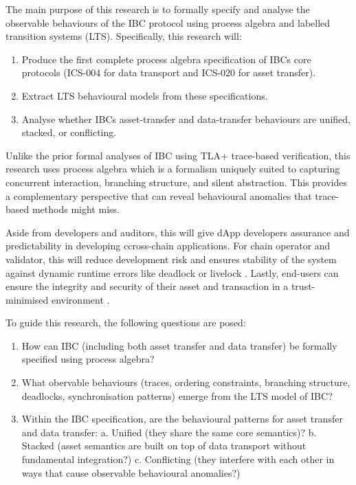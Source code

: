 The main purpose of this research is to formally specify and analyse the
observable behaviours of the IBC protocol using process algebra and
labelled transition systems (LTS). Specifically, this research will:

\begin{enumerate}
\tightlist
\item
  Produce the first complete process algebra specification of
  IBC\textquotesingle s core protocols (ICS-004 for data transport and
  ICS-020 for asset transfer).
\item
  Extract LTS behavioural models from these specifications.
\item
  Analyse whether IBC\textquotesingle s asset-transfer and data-transfer
  behaviours are unified, stacked, or conflicting.
\end{enumerate}

Unlike the prior formal analyses of IBC using TLA+ trace-based
verification, this research uses process algebra which is a formalism
uniquely suited to capturing concurrent interaction, branching
structure, and silent abstraction. This provides a complementary
perspective that can reveal behavioural anomalies that trace-based
methods might miss.

Aside from developers and auditors, this will give dApp developers
assurance and predictability in developing ccross-chain applications.
For chain operator and validator, this will reduce development risk and
ensures stability of the system against dynamic runtime errors like
deadlock or livelock \citep{Kotey_2024} \citep{Duan2018}. Lastly,
end-users can ensure the integrity and security of their asset and
transaction in a trust-minimised environment \citep{Kotey_2024}.

To guide this research, the following questions are posed:

\begin{enumerate}
\tightlist
\item
  How can IBC (including both asset transfer and data transfer) be
  formally specified using process algebra?
\item
  What obervable behaviours (traces, ordering constraints, branching
  structure, deadlocks, synchronisation patterns) emerge from the LTS
  model of IBC?
\item
  Within the IBC specification, are the behavioural patterns for asset
  transfer and data transfer: a. Unified (they share the same core
  semantics)? b. Stacked (asset semantics are built on top of data
  transport without fundamental integration?) c. Conflicting (they
  interfere with each other in ways that cause observable behavioural
  anomalies?)
\end{enumerate}

